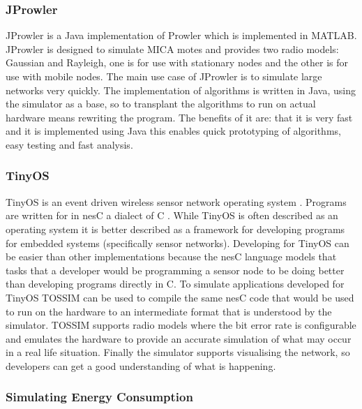 \subsubsection*{JProwler}

JProwler \cite{JProwler} is a Java implementation of Prowler which is implemented in MATLAB. JProwler is designed to simulate MICA motes and provides two radio models: Gaussian and Rayleigh, one is for use with stationary nodes and the other is for use with mobile nodes. The main use case of JProwler is to simulate large networks very quickly. The implementation of algorithms is written in Java, using the simulator as a base, so to transplant the algorithms to run on actual hardware means rewriting the program. The benefits of it are: that it is very fast and it is implemented using Java this enables quick prototyping of algorithms, easy testing and fast analysis.

\subsubsection*{TinyOS}

TinyOS is an event driven wireless sensor network operating system \cite{tinyos}. Programs are written for in nesC a dialect of C \cite{Gay:2003:NLH:780822.781133}. While TinyOS is often described as an operating system it is better described as a framework for developing programs for embedded systems (specifically sensor networks). Developing for TinyOS can be easier than other implementations because the nesC language models that tasks that a developer would be programming a sensor node to be doing better than developing programs directly in C. To simulate applications developed for TinyOS TOSSIM \cite{levis2003tossim} can be used to compile the same nesC code that would be used to run on the hardware to an intermediate format that is understood by the simulator. TOSSIM supports radio models where the bit error rate is configurable and emulates the hardware to provide an accurate simulation of what may occur in a real life situation. Finally the simulator supports visualising the network, so developers can get a good understanding of what is happening.


\subsubsection*{Simulating Energy Consumption}
\cite{Shnayder04}


